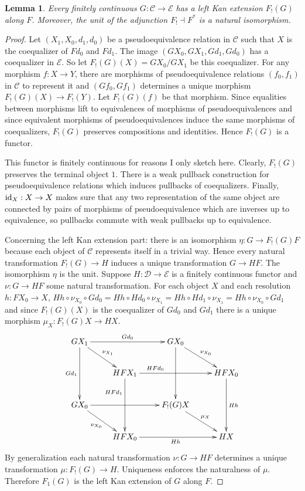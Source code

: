 \documentclass[sort&compress]{elsarticle}
\theoremstyle{plain}
\newtheorem{lemma}[theorem]{Lemma}
\theoremstyle{definition}
\theoremstyle{remark}
\newcommand\cat\mathcal
\begin{document}
\begin{lemma} Every finitely continuous $G:\cat C\to\cat E$ has a left Kan extension $F_!(G)$ along $F$. Moreover, the unit of the adjunction $F_!\dashv F^*$ is a natural isomorphism. \label{LKE}
\end{lemma}

\begin{proof} Let $(X_1,X_0,d_1,d_0)$ be a pseudoequivalence relation in $\cat C$ such that $X$ is the coequalizer of $Fd_0$ and $Fd_1$. The image $(GX_0,GX_1,Gd_1,Gd_0)$ has a coequalizer in $\cat E$. So let $F_!(G)(X) = GX_0/GX_1$ be this coequalizer. For any morphism $f:X\to Y$, there are morphisms of pseudoequivalence relations $(f_0,f_1)$ in $\cat C$ to represent it and $(Gf_0,Gf_1)$ determines a unique morphism $F_!(G)(X) \to F_!(Y)$. Let $F_!(G)(f)$ be that morphism. Since equalities between morphisms lift to equivalences of morphisms of pseudoequivalences and since equivalent morphisms of pseudoequivalences induce the same morphisms of coequalizers, $F_!(G)$ preserves compositions and identities. Hence $F_!(G)$ is a functor.

This functor is finitely continuous for reasons I only sketch here. Clearly, $F_!(G)$ preserves the terminal object $1$. There is a weak pullback construction for pseudoequivalence relations which induces pullbacks of coequalizers. Finally, $\mathrm{id}_X:X\to X$ makes sure that any two representation of the same object are connected by pairs of morphisms of pseudoequivalence which are inverses up to equivalence, so pullbacks commute with weak pullbacks up to equivalence.

Concerning the left Kan extension part: there is an isomorphism $\eta:G \to F_!(G)F$ because each object of $\cat C$ represents itself in a trivial way. Hence every natural transformation $F_!(G) \to H$ induces a unique transformation $G \to HF$. The isomorphism $\eta$ is the unit. Suppose $H:\cat D\to\cat E$ is a finitely continuous functor and $\nu:G\to HF$ some natural transformation. For each object $X$ and each resolution $h:FX_0\to X$, $Hh\circ \nu_{X_0}\circ Gd_0 = Hh\circ Hd_0\circ \nu_{X_1} = Hh\circ Hd_1\circ \nu_{X_1} = Hh\circ \nu_{X_0}\circ Gd_1$ and since $F_!(G)(X)$ is the coequalizer of $Gd_0$ and $Gd_1$ there is a unique morphism $\mu_X: F_!(G)X\to HX$. 
\[\xymatrix{
GX_1 \ar[rr]^{Gd_0}\ar[dd]_{Gd_1}\ar[dr]^{\nu_{X_1}} && GX_0 \ar[dr]^{\nu_{X_0}}\ar[dd] \\
 & HFX_1 \ar[rr]^(.3){HFd_0}\ar[dd]_(.3){HFd_1} && HFX_0 \ar[dd]^{Hh} \\
GX_0\ar[dr]_{\nu_{X_0}}\ar[rr] && F_!(G)X \ar[dr]^{\mu_X} \\
& HFX_0\ar[rr]_{Hh} && HX
}\]
By generalization each natural transformation $\nu:G\to HF$ determines a unique transformation $\mu: F_!(G) \to H$. Uniqueness enforces the naturalness of $\mu$. Therefore $F_1(G)$ is the left Kan extension of $G$ along $F$.
\end{proof}
\end{document}
